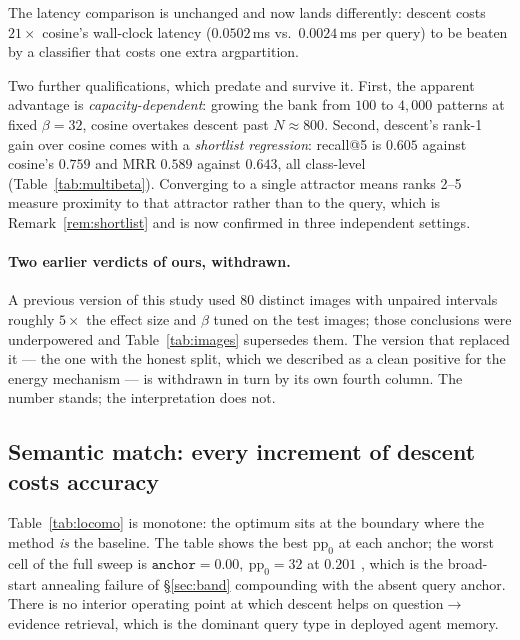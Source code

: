 The latency comparison is unchanged and now lands differently: descent costs $21\times$
cosine's wall-clock latency ($0.0502$\,ms vs.\ $0.0024$\,ms per query) to be beaten by a
classifier that costs one extra argpartition.

Two further qualifications, which predate  and survive it. First, the apparent
advantage is \emph{capacity-dependent}: growing the bank from $100$ to $4{,}000$ patterns at
fixed $\beta{=}32$, cosine overtakes descent past $N\approx 800$. Second, descent's rank-1
gain over cosine comes with a \emph{shortlist regression}: recall@5 is $0.605$ against cosine's $0.759$
and MRR $0.589$ against $0.643$, all class-level (Table~\ref{tab:multibeta}). Converging to a single
attractor means ranks 2--5 measure proximity to that attractor rather than to the query,
which is Remark~\ref{rem:shortlist} and is now confirmed in three independent settings.

\paragraph{Two earlier verdicts of ours, withdrawn.} A previous version of this study used
$80$ distinct images with unpaired intervals roughly $5\times$ the effect size and $\beta$
tuned on the test images; those conclusions were underpowered and Table~\ref{tab:images}
supersedes them. The version that replaced it --- the one with the honest split, which we
described as a clean positive for the energy mechanism --- is withdrawn in turn by its own
fourth column. The number stands; the interpretation does not.

\subsection{Semantic match: every increment of descent costs accuracy}
\label{sec:semantic}

\begin{table}[t]\centering\small
\caption{\textsc{LoCoMo}, $1{,}977$ questions over $5{,}882$ turns. \texttt{anchor}
interpolates between pure cosine ($1.0$) and pure descent ($0.0$); the baseline is a point in
our own parameter space, so the sweep measures exactly what descent adds. The reduction check
passes $196/196$ at $\texttt{anchor}{=}1.0$.}
\label{tab:locomo}

\end{table}

Table~\ref{tab:locomo} is monotone: the optimum sits at the boundary where the method
\emph{is} the baseline. The table shows the best $\mathrm{pp}_0$ at each anchor; the worst
cell of the full sweep is $\texttt{anchor}{=}0.00,\ \mathrm{pp}_0{=}32$ at $0.201$
, which is the broad-start annealing failure of \S\ref{sec:band} compounding
with the absent query anchor. There is no interior operating point at which descent helps on
question$\to$evidence retrieval, which is the dominant query type in deployed agent memory.

